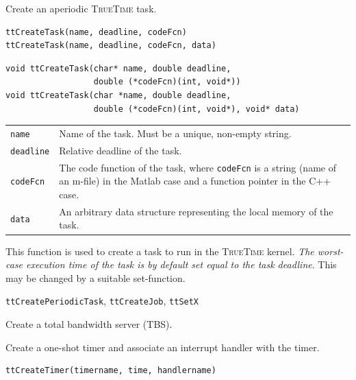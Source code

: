 \documentclass[final,twoside]{rapport}
\begin{document}

\purpose
Create an aperiodic \textsc{TrueTime} task.

\Msyntax
\begin{verbatim}
ttCreateTask(name, deadline, codeFcn)
ttCreateTask(name, deadline, codeFcn, data)
\end{verbatim}

\Csyntax
\begin{verbatim}
void ttCreateTask(char* name, double deadline,
                  double (*codeFcn)(int, void*))
void ttCreateTask(char *name, double deadline,
                  double (*codeFcn)(int, void*), void* data)  
\end{verbatim}

\args
\begin{tabularx}{\hsize}{l>{\raggedright\arraybackslash}X}
  {\tt name} & Name of the task. Must be a unique, non-empty string. \\
  {\tt deadline} & Relative deadline of the task. \\
  {\tt codeFcn} & The code function of the task, where
  \texttt{codeFcn} is a string (name of an m-file) in the
  Matlab case and a function pointer in the C++ case. \\
  {\tt data} & An arbitrary data structure representing the local
  memory of the task.
\end{tabularx}

\descr This function is used to create a task to run in the
\textsc{TrueTime} kernel. 
{\it The worst-case execution time of the task is by default set equal
  to the task deadline}. This may be changed by a suitable
set-function.

\seealso 
{\tt ttCreatePeriodicTask}, {\tt ttCreateJob}, {\tt ttSetX}



\purpose
Create a total bandwidth server (TBS).



\purpose
Create a one-shot timer and associate an interrupt handler with the timer.

\Msyntax
\begin{verbatim}
ttCreateTimer(timername, time, handlername)
\end{verbatim}
\end{document}

